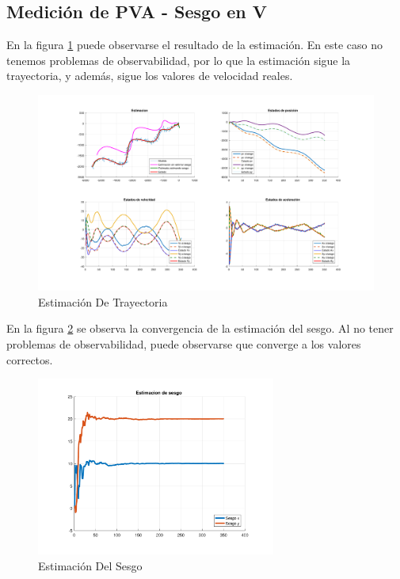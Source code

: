 \subsection{Medición de PVA - Sesgo en V}

	En la figura \ref{fig:ej4d} puede observarse el resultado de la estimación. En este caso no tenemos problemas de observabilidad, por lo que la estimación sigue la trayectoria, y además, sigue los valores de velocidad reales.

	\begin{figure}[H]
		\centering
		\includegraphics[width=1.0\textwidth,keepaspectratio]{Figuras/graf_ej4d.pdf}
		\caption{Estimación De Trayectoria}
		\label{fig:ej4d}
	\end{figure}
	
	En la figura \ref{fig:ej4d_bias} se observa la convergencia de la estimación del sesgo. Al no tener problemas de observabilidad, puede observarse que converge a los valores correctos.
	
	\begin{figure}[H]
		\centering
		\includegraphics[width=0.7\textwidth,keepaspectratio]{Figuras/bias_ej4d.pdf}
		\caption{Estimación Del Sesgo}
		\label{fig:ej4d_bias}
	\end{figure}
	
